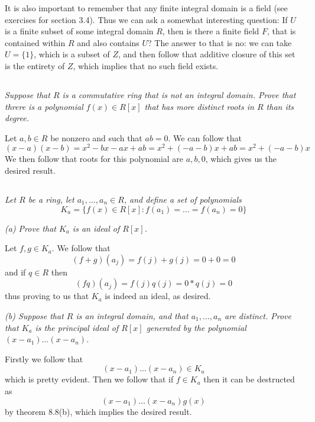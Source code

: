 \documentclass[11pt,oneside,titlepage]{book}
\newcommand{\set}[1]{\{ #1 \}}
\begin{document}
It is also important to remember that any finite integral domain is a
field (see exercises for section 3.4). Thus we can ask a somewhat interesting
question: If $U$ is a finite subset of some integral domain $R$, then
is there a finite field $F$, that is contained within $R$ and also
contains $U$? The answer to that is no: we can take $U = \set{1}$,
which is a subset of $Z$, and then follow that additive closure of this
set is the entirety of $Z$, which implies that no such field exists. 

\subsection{}

\textit{Suppose that $R$ is a commutative ring that is not an integral
  domain. Prove that threre is a polynomial $f(x) \in R[x]$ that has more distinct
  roots in $R$ than its degree.}

Let $a, b \in R$ be nonzero and such that $ab = 0$. We can follow that
$$(x - a)(x - b) = x^2 - bx - ax + ab = x^2 + (-a - b)x + ab = x^2 + (-a - b)x$$
We then follow that roots for this polynomial are $a, b, 0$, which
gives us the desired result.

\subsection{}

\textit{Let $R$ be a ring, let $a_1, ..., a_n \in R$, and define a set of polynomials
  $$K_a = \set{f(x) \in R[x]: f(a_1) = ... = f(a_n) = 0}$$}

\textit{(a) Prove that $K_a$ is an ideal of $R[x]$.}

Let $f, g \in K_a$. We follow that
$$(f + g)(a_j) = f(j) + g(j) = 0 + 0 = 0$$
and if $q \in R$ then
$$(fq)(a_j) = f(j) q(j) = 0 * q(j) = 0$$
thus proving to us that $K_a$ is indeed an ideal, as desired.

\textit{(b) Suppose that $R$ is an integral domain, and that $a_1,
..., a_n$ are distinct. Prove that $K_a$ is the principal ideal of
$R[x]$ generated by the polynomial $(x - a_1) ... (x - a_n)$.}

Firstly we follow that
$$(x - a_1) ... (x - a_n) \in K_a$$
which is pretty evident.
Then we follow that if $f \in K_a$ then it can be destructed as
$$(x - a_1) ... (x - a_n) g(x)$$
by theorem 8.8(b), which implies the desired result.

\subsection{}
\end{document}
